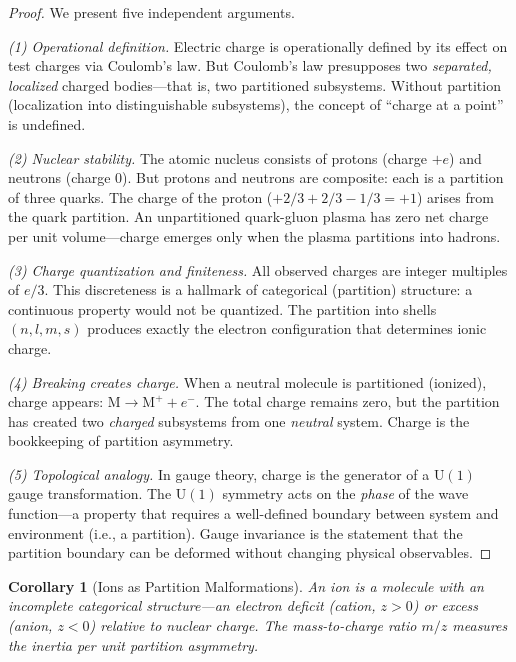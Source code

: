 \documentclass[11pt,twocolumn,a4paper]{article}
\newtheorem{corollary}[theorem]{Corollary}
\theoremstyle{definition}
\theoremstyle{remark}
\begin{document}
\begin{proof}
We present five independent arguments.

\emph{(1) Operational definition.} Electric charge is operationally defined by its effect on test charges via Coulomb's law. But Coulomb's law presupposes two \emph{separated, localized} charged bodies---that is, two partitioned subsystems. Without partition (localization into distinguishable subsystems), the concept of ``charge at a point'' is undefined.

\emph{(2) Nuclear stability.} The atomic nucleus consists of protons (charge $+e$) and neutrons (charge 0). But protons and neutrons are composite: each is a partition of three quarks. The charge of the proton ($+2/3 + 2/3 - 1/3 = +1$) arises from the quark partition. An unpartitioned quark-gluon plasma has zero net charge per unit volume---charge emerges only when the plasma partitions into hadrons.

\emph{(3) Charge quantization and finiteness.} All observed charges are integer multiples of $e/3$. This discreteness is a hallmark of categorical (partition) structure: a continuous property would not be quantized. The partition into shells $(n, l, m, s)$ produces exactly the electron configuration that determines ionic charge.

\emph{(4) Breaking creates charge.} When a neutral molecule is partitioned (ionized), charge appears: $\mathrm{M} \to \mathrm{M}^+ + e^-$. The total charge remains zero, but the partition has created two \emph{charged} subsystems from one \emph{neutral} system. Charge is the bookkeeping of partition asymmetry.

\emph{(5) Topological analogy.} In gauge theory, charge is the generator of a $\mathrm{U}(1)$ gauge transformation. The $\mathrm{U}(1)$ symmetry acts on the \emph{phase} of the wave function---a property that requires a well-defined boundary between system and environment (i.e., a partition). Gauge invariance is the statement that the partition boundary can be deformed without changing physical observables.
\end{proof}

\begin{corollary}[Ions as Partition Malformations]
\label{cor:ions}
An ion is a molecule with an incomplete categorical structure---an electron deficit (cation, $z > 0$) or excess (anion, $z < 0$) relative to nuclear charge. The mass-to-charge ratio $m/z$ measures the inertia per unit partition asymmetry.
\end{corollary}
\end{document}
